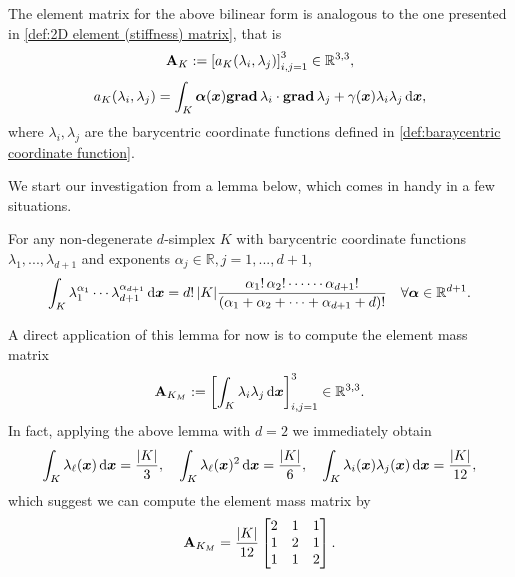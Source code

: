 	The element matrix for the above bilinear form is analogous to the one 
	presented in \eqref{def:2D element (stiffness) matrix}, that is
	\begin{equation}\label{def:2D reaction diffusion element matrix}
		\mathbf{A}_K:=\left[a_K(\lambda_i,\lambda_j)\right]_{i,j=1}^3
			\in\mathbb{R}^{3,3},
	\end{equation}\vspace{-8pt}
	\begin{equation}\label{eq:2D reaction diffusion em formula}
		a_K(\lambda_i,\lambda_j)=\int_K\bm{\alpha}(\bm{x})\mathbf{grad}\,\lambda_i\cdot
		\mathbf{grad}\,\lambda_j+\gamma(\bm{x})\lambda_i \lambda_j\,\mathrm{d}\bm{x},
	\end{equation}
	where $\lambda_i, \lambda_j$ are the barycentric coordinate functions 
	defined in \eqref{def:baraycentric coordinate function}.  
	
	We start our investigation from a lemma below, which comes in handy in
	a few situations.
	\begin{lemma}
	For any non-degenerate $d$-simplex $K$ with barycentric coordinate
	functions $\lambda_1,...,\lambda_{d+1}$ and exponents
	$\alpha_j\in\mathbb{R}, j=1,...,d+1$,
	\[\int_{K}\lambda_1^{\alpha_1}\cdots\lambda_{d+1}^{\alpha_{d+1}}\,\mathrm{d}\bm{x}
		= d!\,|K|\frac{\alpha_1!\,\alpha_2!\cdots\cdots\alpha_{d+1}!}{
		(\alpha_1+\alpha_2+\cdots+\alpha_{d+1}+d)! } \quad  
		\forall \bm{\alpha}\in\mathbb{R}^{d+1}.
	\]
	\end{lemma}

	A direct application of this lemma for now is to compute the element
	mass matrix 
	\[\mathbf{A}_{K_M}:=\left[\int_K\lambda_i\lambda_j\,\mathrm{d}\bm{x}\right]_{i,j=1}^3
			\in\mathbb{R}^{3,3}.\]	
	In fact, applying the above lemma with $d=2$ we immediately obtain 
	\begin{equation}
		\int_{K}\lambda_\ell(\bm{x})\,\mathrm{d}\bm{x} = \frac{|K|}{3},\quad
		\int_{K}\lambda_\ell(\bm{x})^2\,\mathrm{d}\bm{x} = \frac{|K|}{6},\quad
		\int_{K}\lambda_i(\bm{x})\lambda_j(\bm{x})\,\mathrm{d}\bm{x} = \frac{|K|}{12},
	\end{equation}
	which suggest we can compute the element mass matrix by 
	\begin{equation}\label{eq:2D element (mass) matrix formula}
		\mathbf{A}_{K_M}=\frac{|K|}{12}
		\begin{bmatrix}
			2 & 1 & 1\\
			1 & 2 & 1\\
			1 & 1 & 2
		\end{bmatrix}.
	\end{equation}
	
